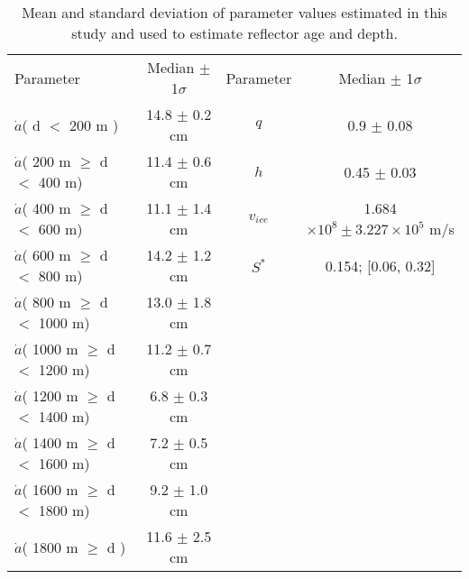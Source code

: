 \documentclass[draft,jgrga]{statclim}
\begin{document}
 \begin{table}
 \centering
 \caption{ Mean and standard deviation of parameter values estimated in this study and used to estimate reflector age and depth. }
 \begin{tabular}{ l c | c c }
Parameter & Median $\pm$ 1$\sigma$ & Parameter & Median $\pm$ 1$\sigma$  \\   
 \cline{1-4}
  $\dot{a}$( d $<$ 200 m )                         & 14.8 $\pm$ 0.2 cm & $q$            &  0.9      $\pm$ 0.08  \\
  $\dot{a}$( 200 m  $\ge$ d $<$ 400 m)    & 11.4 $\pm$ 0.6 cm & $h$            &  0.45     $\pm$ 0.03  \\
  $\dot{a}$( 400 m  $\ge$ d $<$ 600 m)    & 11.1 $\pm$ 1.4 cm & $v_{ice}$   & 1.684  $\times 10^8 \pm 3.227 \times 10^5$ m/s     \\
  $\dot{a}$( 600 m  $\ge$ d $<$ 800 m)    & 14.2 $\pm$ 1.2 cm & $S^{*}$            & 0.154; [0.06, 0.32]    \\
  $\dot{a}$( 800 m  $\ge$ d $<$ 1000 m)  & 13.0 $\pm$ 1.8 cm & \\ 
  $\dot{a}$( 1000 m $\ge$ d $<$ 1200 m) & 11.2 $\pm$ 0.7 cm & \\
  $\dot{a}$( 1200 m $\ge$ d $<$ 1400 m) &   6.8 $\pm$ 0.3 cm & \\
  $\dot{a}$( 1400 m $\ge$ d $<$ 1600 m) &   7.2 $\pm$ 0.5 cm & \\
  $\dot{a}$( 1600 m $\ge$ d $<$ 1800 m) &   9.2 $\pm$ 1.0 cm & \\
  $\dot{a}$( 1800 m $\ge$ d )                    & 11.6 $\pm$ 2.5 cm & \\%
 \end{tabular}

 \label{tab:paramvals}
\end{table}

\end{document}
